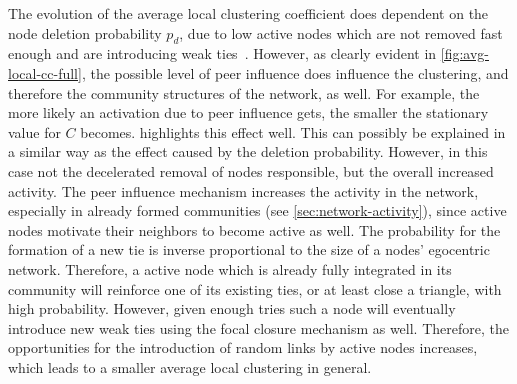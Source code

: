 The evolution of the average local clustering coefficient does dependent on the node deletion probability \( p_{d} \), due to low active nodes which are not removed fast enough and are introducing weak ties~\cite{Laurent2015}.
However, as clearly evident in \cref{fig:avg-local-cc-full}, the possible level of peer influence does influence the clustering, and therefore the community structures of the network, as well.
For example, the more likely an activation due to peer influence gets, the smaller the stationary value for \( C \) becomes.
 highlights this effect well.
This can possibly be explained in a similar way as the effect caused by the deletion probability.
However, in this case not the decelerated removal of nodes responsible, but the overall increased activity.
The peer influence mechanism increases the activity in the network, especially in already formed communities (see \cref{sec:network-activity}), since active nodes motivate their neighbors to become active as well.
The probability for the formation of a new tie is inverse proportional to the size of a nodes' egocentric network.
Therefore, a active node which is already fully integrated in its community will reinforce one of its existing ties, or at least close a triangle, with high probability.
However, given enough tries such a node will eventually introduce new weak ties using the focal closure mechanism as well.
Therefore, the opportunities for the introduction of random links by active nodes increases, which leads to a smaller average local clustering in general.

